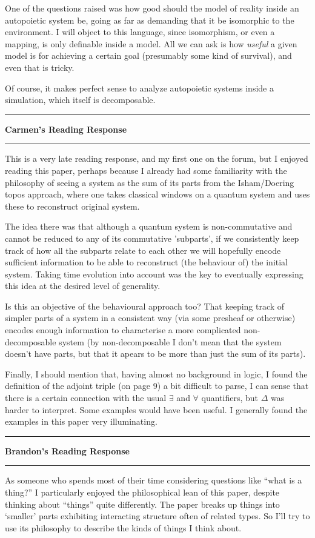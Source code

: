 \documentclass{amsart}
\newcommand{\iam}[1]{
  \vspace{0.25em}
  \hrule
  \vspace{0.25em}
  \textbf{{#1}'s Reading Response}
  \vspace{0.25em}
  \hrule
  \vspace{1em}
}
\begin{document}
One of the questions raised was how good should the model of reality inside an autopoietic system be, going as far as demanding that it be isomorphic to the environment. I will object to this language, since isomorphism, or even a mapping, is only definable inside a model. All we can ask is how \emph{useful} a given model is for achieving a certain goal (presumably some kind of survival), and even that is tricky.

Of course, it makes perfect sense to analyze autopoietic systems inside a simulation, which itself is decomposable.


\iam{Carmen}

This is a very late reading response, and my first one on the forum, but I enjoyed reading this paper, perhaps because I already had some familiarity with the philosophy of seeing a system as the sum of its parts from the Isham/Doering topos approach, where one takes classical windows on a quantum system and uses these to reconstruct original system.

The idea there was that although a quantum system is non-commutative and cannot be reduced to any of its commutative 'subparts', if we consistently keep track of how all the subparts relate to each other we will hopefully encode sufficient information to be able to reconstruct (the behaviour of) the initial system. Taking time evolution into account was the key to eventually expressing this idea at the desired level of generality.

Is this an objective of the behavioural approach too? That keeping track of simpler parts of a system in a consistent way (via some presheaf or otherwise) encodes enough information to characterise a more complicated non-decomposable system (by non-decomposable I don't mean that the system doesn't have parts, but that it apears to be more than just the sum of its parts).

Finally, I should mention that, having almost no background in logic, I found the definition of the adjoint triple (on page 9) a bit difficult to parse, I can sense that there is a certain connection with the usual $\exists$ and $\forall$ quantifiers, but $\Delta$ was harder to interpret. Some examples would have been useful. I generally found the examples in this paper very illuminating.

\iam{Brandon}

As someone who spends most of their time considering questions like ``what is a thing?'' I particularly enjoyed the philosophical lean of this paper, despite thinking about ``things'' quite differently. The paper breaks up things into `smaller' parts exhibiting interacting structure often of related types.  So I'll try to use its philosophy to describe the kinds of things I think about.
\end{document}
